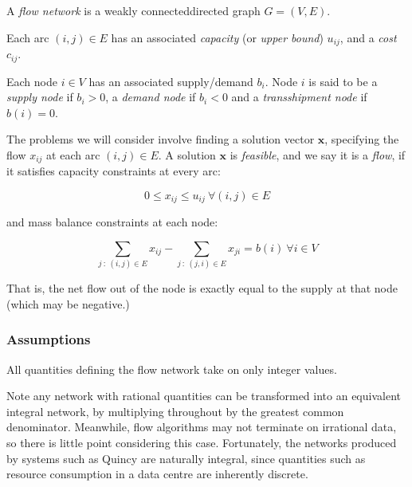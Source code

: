 A \emph{flow network} is a weakly connected\footnotemark directed graph $G=(V,E)$.

Each arc $(i,j)\in E$ has an associated \emph{capacity} (or \emph{upper	bound}\footnotemark) $u_{ij}$, and a \emph{cost} $c_{ij}$.

Each node $i\in V$ has an associated supply/demand $b_{i}$. Node $i$ is said to be a \emph{supply node} if $b_{i}>0$, a \emph{demand	node} if $b_{i}<0$ and a \emph{transshipment node} if $b(i)=0$.

The problems we will consider involve finding a solution vector $\mathbf{x}$,
specifying the flow $x_{ij}$ at each arc $(i,j)\in E$. A solution
$\mathbf{x}$ is \emph{feasible}, and we say it is a \emph{flow}, if it satisfies capacity constraints at every arc:

\begin{equation}
0\leq x_{ij}\leq u_{ij}\:\forall(i,j)\in E
\end{equation}\label{eq:capacity-constraints}

and mass balance constraints at each node:

\begin{equation}
\sum_{j\::\:(i,j)\in E}x_{ij}-\sum_{j\::\:(j,i)\in E}x_{ji}=b(i)\:\forall i\in V
\end{equation} \label{eq:mass-balance}

That is, the net flow out of the node is exactly equal to the supply
at that node (which may be negative.)

\subsubsection{Assumptions}

\begin{assumption}[Integrality] \label{assumption:integrality}
All quantities defining the flow network take on only integer values.\end{assumption}
    
Note any network with rational quantities can be transformed into an equivalent integral network, by multiplying throughout by the greatest common denominator. Meanwhile, flow algorithms may not terminate on irrational data, so there is little point considering this case. Fortunately, the networks produced by systems such as Quincy are naturally integral, since quantities such as resource consumption in a data centre are inherently discrete. \\

